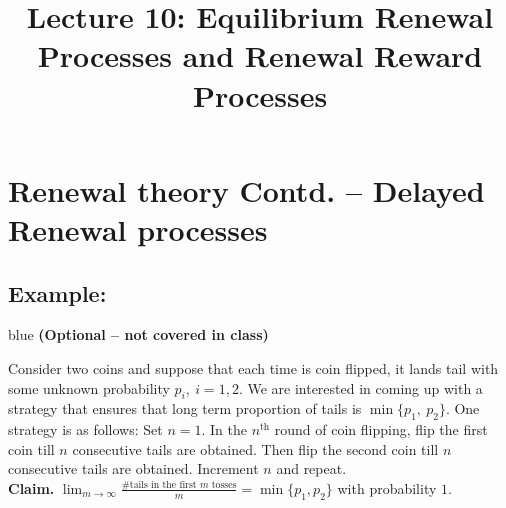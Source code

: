 \documentclass[a4paper,10pt,english]{article}
\title{Lecture 10: Equilibrium Renewal Processes and Renewal Reward Processes}
\author{}
\begin{document}
\maketitle
\section{Renewal theory Contd. -- Delayed Renewal processes }

\subsection{Example:}

\begin{color}{blue} {\bf (Optional -- not covered in class)} \end{color}

Consider two coins and suppose  that each time is coin flipped, it lands tail with some unknown probability $p_i,~i=1,2.$ We are interested in coming up with a strategy that ensures that long term proportion of tails is $\min\{p_1,~p_2\}.$ One strategy is as follows: Set $n = 1$. In the $n^\text{th}$ round of coin flipping, flip the first coin till $n$ consecutive tails are obtained. Then flip the second coin till $n$ consecutive tails are obtained. Increment $n$ and repeat. \\

{\bf Claim.} $\lim_{m \to \infty} \frac{\# \mbox{tails in the first
    $m$ tosses}}{m} = \min\{p_1, p_2\}$ with probability $1$.\\
\end{document}
